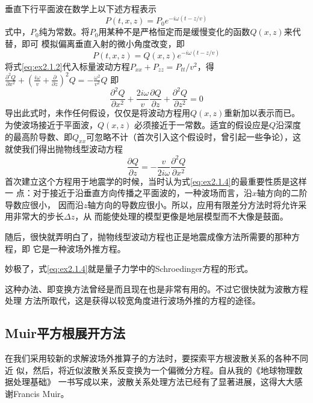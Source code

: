 垂直下行平面波在数学上以下述方程表示
\begin{equation}
P(t,x,z)=P_0e^{-i\omega (t-z/v)}
\label{eq:ex2.1.1}
\end{equation}
式中，$P_0$纯为常数。将$P_0$用某种不是严格恒定而是缓慢变化的函数$Q(x,z)$来代替，即可
模拟偏离垂直入射的微小角度改变，即
\begin{equation}
P(t,x,z)=Q(x,z)e^{-i\omega (t-z/v)}
\label{eq:ex2.1.2}
\end{equation}
将式\ref{eq:ex2.1.2}代入标量波动方程$P_{xx}+P_{zz}=P_{tt}/v^2$，得
$\frac{\partial^2 Q }{\partial x^2}+(\frac{i\omega}{v}+\frac{\partial}{\partial z})^2Q
=-\frac{\omega^2}{v^2}Q$
即
\begin{equation}
\frac{\partial^2 Q }{\partial x^2}+\frac{2i\omega}{v}\frac{\partial Q}{\partial z}+\frac{\partial^2 Q}
{\partial z^2}=0
\label{eq:ex2.1.3}
\end{equation}
导出此式时，未作任何假设，仅仅是将波动方程用$Q(x,z)$重新加以表示而已。为使波场接近于平面波，$Q(x,z)$
必须接近于一常数。适宜的假设应是$Q$沿深度的最高阶导数、即$Q_{xx}$可忽略不计（首次引入这个假设时，曾引起一些争论），这就使我们得出抛物线型波动方程
\begin{equation}
\frac{\partial Q }{\partial z}=-\frac{v}{2i\omega}\frac{\partial^2 Q }{\partial x^2}
\label{eq:ex2.1.4}
\end{equation}
首次建立这个方程用于地震学的时候，当时认为式\ref{eq:ex2.1.4}的最重要性质是这样一
点：对于接近于沿垂直方向传播之平面波的，一种波场而言，沿$x$轴方向的二阶导数应很小，
因而沿$z$轴方向的导数应很小。所以，应用有限差分方法时将允许采用非常大的步长$\Delta z$，从
而能使处理的模型更像是地层模型而不大像是鼓面。

随后，很快就弄明白了，抛物线型波动方程也正是地震成像方法所需要的那种方程，即
它是一种波场外推方程。

妙极了，式\ref{eq:ex2.1.4}就是量子力学中的Schroedinger方程的形式。

这种办法、即变换方法曾经是而且现在也是非常有用的。不过它很快就为波散方程处理
方法所取代，这是获得以较宽角度进行波场外推的方程的途径。

\subsection{Muir平方根展开方法}
\label{sec:2.1.2}

在我们采用较新的求解波场外推算子的方法时，要探索平方根波散关系的各种不同近
似，然后，将近似波散关系反变换为一个偏微分方程。自从我的《地球物理数据处理基础》
一书写成以来，波散关系处理方法已经有了显著进展，这得大大感谢Francis
Muir。

